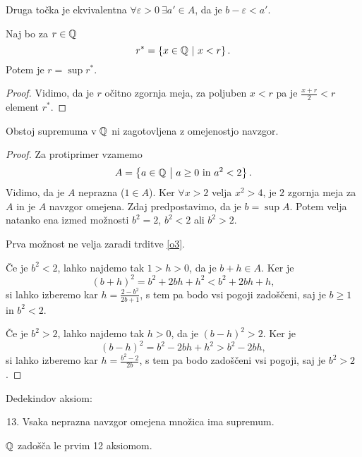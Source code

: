\documentclass[12pt, a4paper]{article}
\begin{document}
\begin{opomba}
Druga točka je ekvivalentna $\forall\varepsilon>0~\exists a'\in A$, da je $b-\varepsilon < a'$.
\end{opomba}

\begin{opomba}
Naj bo za $r\in\mathbb{Q}$
\[
r^*=\left\{x\in\mathbb{Q}~\middle\vert~x<r\right\}.
\]
Potem je $r=\sup r^*$.
\end{opomba}

\begin{proof}
Vidimo, da je $r$ očitno zgornja meja, za poljuben $x<r$ pa je $\frac{x+r}{2}<r$ element $r^*$.
\end{proof}

\begin{opomba}
Obstoj supremuma v $\mathbb{Q}$ ni zagotovljena z omejenostjo navzgor.
\end{opomba}

\begin{proof}
Za protiprimer vzamemo
\[
A=\left\{a\in\mathbb{Q}~\middle\vert~\text{$a\geq 0$ in $a^2<2$}\right\}.
\]
Vidimo, da je $A$ neprazna ($1\in A$). Ker $\forall x>2$ velja  $x^2>4$, je $2$ zgornja meja za $A$ in je $A$ navzgor omejena. Zdaj predpostavimo, da je $b=\sup A$. Potem velja natanko ena izmed možnosti $b^2=2$, $b^2<2$ ali $b^2>2$.

Prva možnost ne velja zaradi trditve \ref{o3}.

Če je $b^2<2$, lahko najdemo tak $1>h>0$, da je $b+h\in A$. Ker je
\[(b+h)^2=b^2+2bh+h^2<b^2+2bh+h,\]
si lahko izberemo kar $h=\frac{2-b^2}{2b+1}$, s tem pa bodo vsi pogoji zadoščeni, saj je $b\geq 1$ in $b^2<2$.

Če je $b^2>2$, lahko najdemo tak $h>0$, da je $(b-h)^2>2$. Ker je
\[(b-h)^2=b^2-2bh+h^2>b^2-2bh,\]
si lahko izberemo kar $h=\frac{b^2-2}{2b}$, s tem pa bodo zadoščeni vsi pogoji, saj je $b^2>2$.
\end{proof}

\begin{okvir}
\begin{definicija}
Dedekindov aksiom:

\begin{enumerate}[label=A\arabic*.]
\setcounter{enumi}{12}
\item Vsaka neprazna navzgor omejena množica ima supremum.
\end{enumerate}
\end{definicija}
\end{okvir}

\begin{opomba}
$\mathbb{Q}$ zadošča le prvim 12 aksiomom.
\end{opomba}
\end{document}

